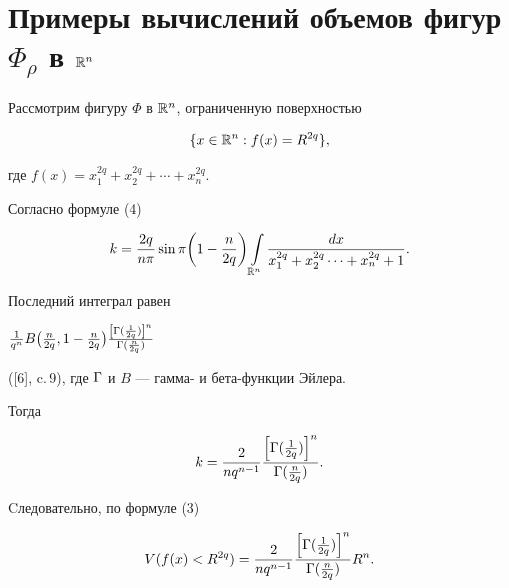 \section{Примеры вычислений объемов фигур $\Phi_\rho$ в ${\Bbb R}^n$}





\begin{exam}


Рассмотрим фигуру $\Phi$ в ${\Bbb R}^n$, ограниченную поверхностью


$$


\{x\in {\Bbb R}^n : f(x)=R^{2q}\},


$$


где $f(x)=x^{2q}_1+x^{2q}_2 +\dotsb +x^{2q}_n$.


Согласно формуле (4)


$$


k=\frac{2q}{n\pi}\sin\pi\bigg (1-\frac{n}{2q}\bigg)


\int\limits_{{\Bbb R}^n}\frac{dx}{x^{2q}_1+x^{2q}_2\dotsb+x^{2q}_n+1}.


$$


Последний интеграл равен


$\frac 1{q^n} B\big (\frac {n}{2q},1-\frac {n}{2q}\big)


\frac {\left [\Gam(\frac 1{2q})\right ]^n}{\Gam(\frac n{2q})}$


([6], c.\,9), где $\Gamma$ и $B$ --- гамма- и бета-функции Эйлера.


Тогда


$$


k=\frac 2{nq^{n-1}}\frac{\left [\Gam(\frac 1{2q})\right ]^n}


{\Gam(\frac n{2q})}.


$$


Cледовательно, по формуле (3)


$$


V(f(x)<R^{2q})=\frac 2{nq^{n-1}}\frac{\left [\Gam(\frac 1{2q})\right ]^n}


{\Gam(\frac n{2q})}R^n.


$$


\end{exam}






